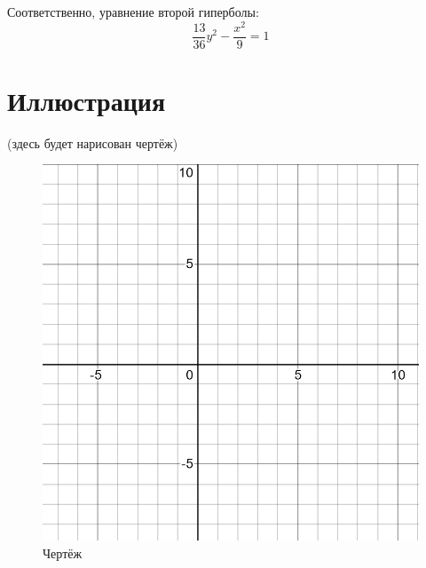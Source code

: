 \documentclass[12pt, a4paper]{article}
\begin{document}
    Соответственно, уравнение второй гиперболы:
    \begin{equation}
        \frac{13}{36} y^2 - \frac{x^2}{9} = 1
    \end{equation}


    \section{Иллюстрация}
    
    (здесь будет нарисован чертёж)
    

    \begin{figure}[h!]
        \centering
        \includegraphics[width=\textwidth]{resources/1.6_grid.png}
        \caption{Чертёж}
        \label{fig:main_figure}
    \end{figure}
    \FloatBarrier
\end{document}
